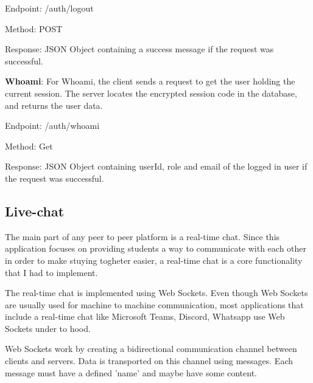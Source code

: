 Endpoint: /auth/logout

Method: POST

Response: JSON Object containing a success message if the request was successful.

\textbf{Whoami}: For Whoami, the client sends a request to get the user holding the current session. The server locates the encrypted session code in the database, and returns the user data.

Endpoint: /auth/whoami

Method: Get

Response: JSON Object containing userId, role and email of the logged in user if the request was successful.

\subsection{Live-chat}
The main part of any peer to peer platform is a real-time chat. Since this application focuses on providing students a way to communicate with each other in order to make stuying togheter easier, a real-time chat is a core functionality that I had to implement.

The real-time chat is implemented using Web Sockets\cite{WEB_SOCKET}. Even though Web Sockets are usually used for machine to machine communication, most applications that include a real-time chat like Microsoft Teams, Discord, Whatsapp use Web Sockets under to hood.

Web Sockets work by creating a bidirectional communication channel between clients and servers. Data is transported on this channel using messages. Each message must have a defined 'name' and maybe have some content.


